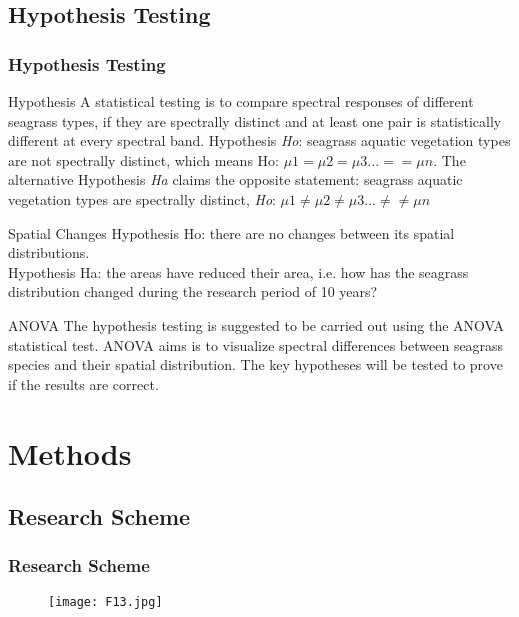 \documentclass[pdflatex,compress,8pt,
	xcolor={dvipsnames,dvipsnames,svgnames,x11names,table},
	hyperref={colorlinks = true,breaklinks = true, urlcolor = NavyBlue, breaklinks = true}]{beamer}
\begin{document}
\subsection{Hypothesis Testing}
\begin{frame}\frametitle{Hypothesis Testing}
\begin{alertblock}{Hypothesis}
A statistical testing is to compare spectral responses of different seagrass types, if they are spectrally distinct and at least one pair is statistically different at every spectral band. Hypothesis \emph{Ho}: seagrass aquatic vegetation types are not spectrally distinct, which means Ho: $\mu 1 = \mu 2 = \mu 3 ... = = \mu n$. The alternative Hypothesis \emph{Ha} claims the opposite statement: seagrass aquatic vegetation types are spectrally distinct, \emph{Ho}: $\mu 1 \neq \mu 2 \neq \mu 3 ... \neq \neq \mu n$
\end{alertblock}

\begin{block}{Spatial Changes}
Hypothesis Ho: there are no changes between its spatial distributions. \\
Hypothesis Ha: the areas have reduced their area, i.e. how has the seagrass distribution changed during the research period of 10 years?
\end{block}

\begin{block}{ANOVA}
The hypothesis testing is suggested to be carried out using the ANOVA statistical test. ANOVA aims is to visualize spectral differences between seagrass species and their spatial distribution. The key hypotheses will be tested to prove if the results are correct. 
\end{block}

\end{frame}

\section{Methods}

\subsection{Research Scheme}
\begin{frame}\frametitle{Research Scheme}
\begin{figure}[H]
	\centering
		\texttt{[image: F13.jpg]}
\end{figure}
\end{frame}
\end{document}
